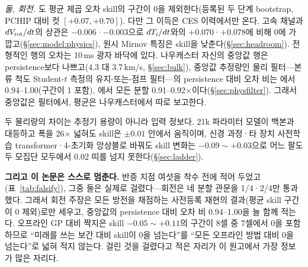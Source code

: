 \documentclass[10pt,a4paper]{article}
\begin{document}
\emph{둘, 회전.} \Vrot{}도 평균 제곱 오차 skill의 구간이 0을 제외한다(등록된 두 단계
bootstrap, PCHIP 대비 컷 $[+0.07, +0.70]$). 다만 그 이득은 CES 이력에서만 온다.
고속 채널과 $dV_\mathrm{rot}/dt$의 상관은 $-0.006$·$-0.003$으로 $dT_i/dt$와의
$+0.070$·$+0.078$에 비해 0에 가깝고(\S\ref{sec:model:physics}), 원시 Mirnov 특징은
skill을 낮춘다(\S\ref{sec:headroom}). 전형적인 행의 오차는 10\,ms 광자 바닥에 있다.
나우캐스터 자신의 \Vrot{} 중앙값 행은 persistence보다 나쁘고(4.3 대
3.7\,km/s, \S\ref{sec:bulk}), 중앙값 추정량인 물리 필터---본류 척도 Student-$t$
측정의 유지-또는-점프 필터---의 persistence 대비 오차 비는 \Vrot{}에서
0.94--1.00(구간이 1 포함), \Ti{}에서 모든 분할 0.91--0.92$\times$이다(\S\ref{sec:physfilter}).
그래서 중앙값은 필터에서, 평균은 나우캐스터에서 따로 보고한다.

두 물리량의 차이는 추정기 용량이 아니라 입력 정보다. 21k 파라미터 모델이 백본과
대등하고 폭을 26$\times$ 넓혀도 skill은 $\pm0.01$ 안에서 움직이며, 신경 과정·타 장치
사전학습 transformer·4-초기화 앙상블로 바꿔도 \Ti{} skill 변화는 $-0.09\sim+0.03$으로
어느 팔도 두 모집단 모두에서 0.02 띠를 넘지 못한다(\S\ref{sec:ladder}).

\textbf{그리고 이 논문은 스스로 멈춘다.} 반증 지점 여섯을 착수 전에 적어 두었고
(표~\ref{tab:falsify}), 그중 둘은 실제로 걸렸다---회전은 네 분할 관문을 1/4·2/4만
통과했다. 그래서 회전 주장은 모든 방전을 채점하는 사전등록 재현의 결과(평균 skill
구간이 0 제외)로만 세우고, 중앙값의 persistence 대비 오차 비 0.94--1.00을 늘 함께
적는다. 오프라인 GP 대비 짝지은 skill
$-0.05\sim+0.11$의 구간이 8셀 중 7셀에서 0을 포함하므로 ``미래를 쓰는 보간 대비
skill이 0을 넘는다''를 ``모든 오프라인 방법 대비 0을 넘는다''로 넓혀 적지 않는다. 걸린 것을 걸렸다고 적은
자리가 이 원고에서 가장 정보가 많은 자리다.
\end{document}
